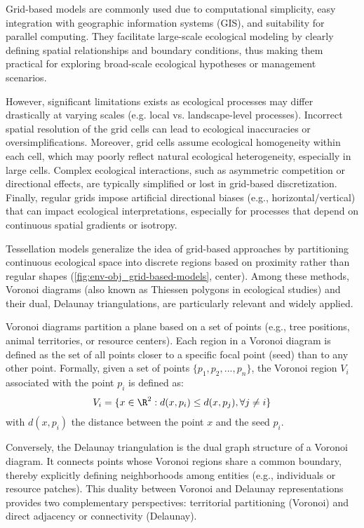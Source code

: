Grid-based models are commonly used due to computational simplicity, easy integration with geographic information systems (GIS), and suitability for parallel computing. They facilitate large-scale ecological modeling by clearly defining spatial relationships and boundary conditions, thus making them practical for exploring broad-scale ecological hypotheses or management scenarios.

However, significant limitations exists as ecological processes may differ drastically at varying scales (e.g. local vs. landscape-level processes). Incorrect spatial resolution of the grid cells can lead to ecological inaccuracies or oversimplifications. Moreover, grid cells assume ecological homogeneity within each cell, which may poorly reflect natural ecological heterogeneity, especially in large cells. Complex ecological interactions, such as asymmetric competition or directional effects, are typically simplified or lost in grid-based discretization. Finally, regular grids impose artificial directional biases (e.g., horizontal/vertical) that can impact ecological interpretations, especially for processes that depend on continuous spatial gradients or isotropy.

Tessellation models generalize the idea of grid-based approaches by partitioning continuous ecological space into discrete regions based on proximity rather than regular shapes (\cref{fig:env-obj_grid-based-models}, center). Among these methods, Voronoi diagrams (also known as Thiessen polygons in ecological studies) and their dual, Delaunay triangulations, are particularly relevant and widely applied.

Voronoi diagrams partition a plane based on a set of points (e.g., tree positions, animal territories, or resource centers). Each region in a Voronoi diagram is defined as the set of all points closer to a specific focal point (seed) than to any other point. Formally, given a set of points $\{p_1, p_2, ..., p_n\}$, the Voronoi region $V_i$ associated with the point $p_i$ is defined as:
\begin{align}
    V_i = \{ x \in \R^2 : d(x, p_i) \leq d(x, p_j), \forall j \neq i \}
\end{align}
with $d(x, p_i)$ the distance between the point $x$ and the seed $p_i$.

Conversely, the Delaunay triangulation is the dual graph structure of a Voronoi diagram. It connects points whose Voronoi regions share a common boundary, thereby explicitly defining neighborhoods among entities (e.g., individuals or resource patches). This duality between Voronoi and Delaunay representations provides two complementary perspectives: territorial partitioning (Voronoi) and direct adjacency or connectivity (Delaunay).

